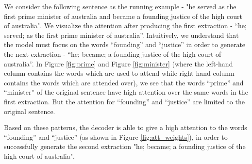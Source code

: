     We consider the following sentence as the running example - "he served as the first prime minister of australia and became a founding justice of the high court of australia". We visualize the attention after producing the first extraction - ``he; served; as the first prime minister of australia''. Intuitively, we understand that the model must focus on the words ``founding'' and ``justice'' in order to generate the next extraction - ``he; became; a founding justice of the high court of australia''. In Figure \ref{fig:prime} and Figure \ref{fig:minister} (where the left-hand column contains the words which are used to attend while right-hand column contains the words which are attended over), we see that the words ``prime'' and ``minister'' of the original sentence have high attention over the same words in the first extraction. But the attention for ``founding'' and ``justice'' are limited to the original sentence.
    
    Based on these patterns, the decoder is able to give a high attention to the words ``founding'' and ``justice'' (as shown in Figure \ref{fig:att_weights}), in-order to successfully generate the second extraction "he; became; a founding justice of the high court of australia".
    
